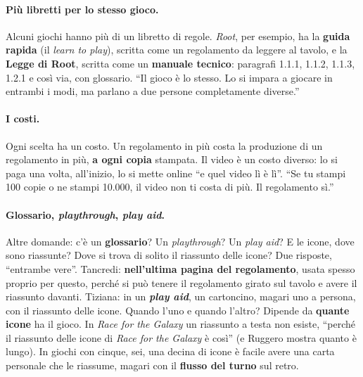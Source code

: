 \paragraph{Più libretti per lo stesso gioco.} Alcuni giochi hanno più di un libretto di
regole. \emph{Root}, per esempio, ha la \textbf{guida rapida} (il \emph{learn to play}),
scritta come un regolamento da leggere al tavolo, e la \textbf{Legge di Root}, scritta
come un \textbf{manuale tecnico}: paragrafi 1.1.1, 1.1.2, 1.1.3, 1.2.1 e così via, con
glossario. ``Il gioco è lo stesso. Lo si impara a giocare in entrambi i modi, ma parlano
a due persone completamente diverse.''

\paragraph{I costi.} Ogni scelta ha un costo. Un regolamento in più costa la
produzione di un regolamento in più, \textbf{a ogni copia} stampata. Il video è un costo
diverso: lo si paga una volta, all'inizio, lo si mette online ``e quel video lì è lì''.
``Se tu stampi 100 copie o ne stampi 10.000, il video non ti costa di più. Il
regolamento sì.''

\paragraph{Glossario, \emph{playthrough}, \emph{play aid}.} Altre domande: c'è un
\textbf{glossario}? Un \emph{playthrough}? Un \emph{play aid}? E le icone, dove sono
riassunte? Dove si trova di solito il riassunto delle icone? Due risposte, ``entrambe
vere''. Tancredi: \textbf{nell'ultima pagina del regolamento}, usata spesso proprio per
questo, perché si può tenere il regolamento girato sul tavolo e avere il riassunto
davanti. Tiziana: in un \textbf{\emph{play aid}}, un cartoncino, magari uno a persona,
con il riassunto delle icone. Quando l'uno e quando l'altro? Dipende da \textbf{quante
icone} ha il gioco. In \emph{Race for the Galaxy} un riassunto a testa non esiste,
``perché il riassunto delle icone di \emph{Race for the Galaxy} è così'' (e Ruggero
mostra quanto è lungo). In giochi con cinque, sei, una decina di icone è facile avere
una carta personale che le riassume, magari con il \textbf{flusso del turno} sul retro.

